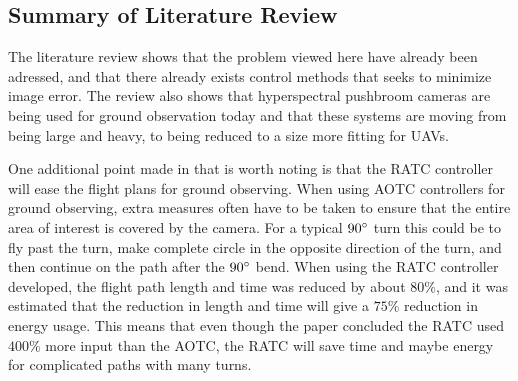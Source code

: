 \subsection{Summary of Literature Review}
The literature review shows that the problem viewed here have already been adressed, and that there already exists control methods that seeks to minimize image error. The review also shows that hyperspectral pushbroom cameras are being used for ground observation today and that these systems are moving from being large and heavy, to being reduced to a size more fitting for UAVs.

One additional point made in \cite{ratcFISHER} that is worth noting is that the RATC controller will ease the flight plans for ground observing. When using AOTC controllers for ground observing, extra measures often have to be taken to ensure that the entire area of interest is covered by the camera. For a typical $90 \degree$ turn this could be to fly past the turn, make complete circle in the opposite direction of the turn, and then continue on the path after the $90 \degree$ bend. When using the RATC controller developed, the flight path length and time was reduced by about $80 \%$, and it was estimated that the reduction in length and time will give a $75\%$ reduction in energy usage. This means that even though the paper concluded the RATC used $400 \%$ more input than the AOTC, the RATC will save time and maybe energy for complicated paths with many turns.